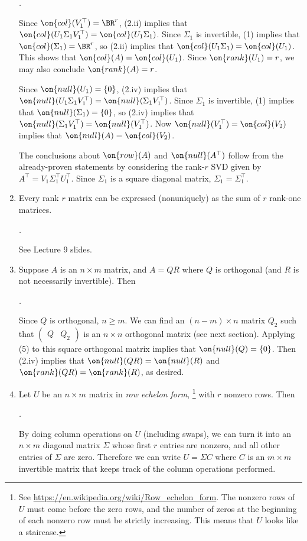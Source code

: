 \documentclass[10pt]{amsart}
\makeatletter
\renewenvironment{proof}[1][\proofname]{\par
	\pushQED{\qed}%
	\normalfont \topsep6\p@\@plus6\p@\relax
	\noindent\emph{#1.} 
	\ignorespaces
}{%
\popQED\endtrivlist\@endpefalse
}
\theoremstyle{mythm}
\theoremstyle{definition}
\theoremstyle{myrmk}
\newenvironment{myproof}{\color{blue}\begin{proof}}{\end{proof}}
\makeatother
\begin{document}
\begin{enumerate}[label=(\arabic*)]
\begin{myproof}
			Since $\on{col}(V_1^\top) = \BR^r$, (2.ii) implies that $\on{col}(U_1\Sigma_1V_1^\top) = \on{col}(U_1\Sigma_1)$. Since $\Sigma_1$ is invertible, (1) implies that $\on{col}(\Sigma_1) = \BR^r$, so (2.ii) implies that $\on{col}(U_1\Sigma_1)= \on{col}(U_1)$. This shows that $\on{col}(A) = \on{col}(U_1)$. Since $\on{rank}(U_1) = r$, we may also conclude $\on{rank}(A) = r$. 
			
			Since $\on{null}(U_1) = \{0\}$, (2.iv) implies that $\on{null}(U_1\Sigma_1V_1^\top) = \on{null}(\Sigma_1V_1^\top)$. Since $\Sigma_1$ is invertible, (1) implies that $\on{null}(\Sigma_1) = \{0\}$, so (2.iv) implies that $\on{null}(\Sigma_1V_1^\top) = \on{null}(V_1^\top)$. Now $\on{null}(V_1^\top) = \on{col}(V_2)$ implies that $\on{null}(A) = \on{col}(V_2)$. 
			
			The conclusions about $\on{row}(A)$ and $\on{null}(A^\top)$ follow from the already-proven statements by considering the rank-$r$ SVD given by $A^\top = V_1 \Sigma_1^\top U_1^\top$. Since $\Sigma_1$ is a square diagonal matrix, $\Sigma_1 = \Sigma_1^\top$. 
		\end{myproof}
		\item Every rank $r$ matrix can be expressed (nonuniquely) as the sum of $r$ rank-one matrices. 
		\begin{myproof}
			See Lecture 9 slides. 
		\end{myproof}
		\item Suppose $A$ is an $n \times m$ matrix, and $A = QR$ where $Q$ is orthogonal (and $R$ is not necessarily invertible). Then 
		\begin{myproof}
			Since $Q$ is orthogonal, $n \ge m$. We can find an $(n-m) \times n$ matrix $Q_2$ such that $\left( \begin{array}{c|c} Q & Q_2 \end{array} \right)$ is an $n \times n$ orthogonal matrix (see next section). Applying (5) to this square orthogonal matrix implies that $\on{null}(Q) = \{0\}$. Then (2.iv) implies that $\on{null}(QR) = \on{null}(R)$ and $\on{rank}(QR) = \on{rank}(R)$, as desired. 
		\end{myproof}
		\item Let $U$ be an $n \times m$ matrix in \emph{row echelon form}, \footnote{See \url{https://en.wikipedia.org/wiki/Row_echelon_form}. The nonzero rows of $U$ must come before the zero rows, and the number of zeros at the beginning of each nonzero row must be strictly increasing. This means that $U$ looks like a staircase.} with $r$ nonzero rows. Then 
		\begin{myproof}
			By doing column operations on $U$ (including swaps), we can turn it into an $n \times m$ diagonal matrix $\Sigma$ whose first $r$ entries are nonzero, and all other entries of $\Sigma$ are zero. Therefore we can write $U = \Sigma C$ where $C$ is an $m \times m$ invertible matrix that keeps track of the column operations performed. 
			

\end{myproof}
\end{enumerate}
\end{document}
